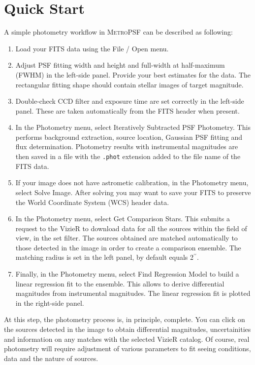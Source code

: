 \documentclass{article}
\newcommand\arcsec{\mbox{$^{\prime\prime}$}}%
\begin{document}
\section{Quick Start} \label{quickstart}
A simple photometry workflow in \textsc{MetroPSF} can be described as following:
\begin{enumerate}
\item Load your FITS data using the File / Open menu. 
\item Adjust PSF fitting width and height and full-width at half-maximum (FWHM) in the left-side panel. Provide your best estimates for the data. The rectangular fitting shape should contain stellar images of target magnitude. 
\item Double-check CCD filter and exposure time are set correctly in the left-side panel. These are taken automatically from the FITS header when present. 
\item In the Photometry menu, select Iteratively Subtracted PSF Photometry. This performs background extraction, source location, Gaussian PSF fitting and flux determination. Photometry results with instrumental magnitudes are then saved in a file with the \texttt{.phot} extension added to the file name of the FITS data. 
\item If your image does not have astrometic calibration, in the Photometry menu, select Solve Image. After solving you may want to save your FITS to preserve the World Coordinate System (WCS) header data. 
\item In the Photometry menu, select Get Comparison Stars. This submits a request to the VizieR to download data for all the sources within the field of view, in the set filter. The sources obtained are matched automatically to those detected in the image in order to create a comparison ensemble. The matching radius is set in the left panel, by default equals 2\arcsec.  
\item Finally, in the Photometry menu, select Find Regression Model to build a linear regression fit to the ensemble. This allows to derive differential magnitudes from instrumental magnitudes. The linear regression fit is plotted in the right-side panel. 
\end{enumerate}
At this step, the photometry process is, in principle, complete. You can click on the sources detected in the image to obtain differential magnitudes, uncertainities and information on any matches with the selected VizieR catalog. Of course, real photometry will require adjustment of various parameters to fit seeing conditions, data and the nature of sources.
\end{document}
